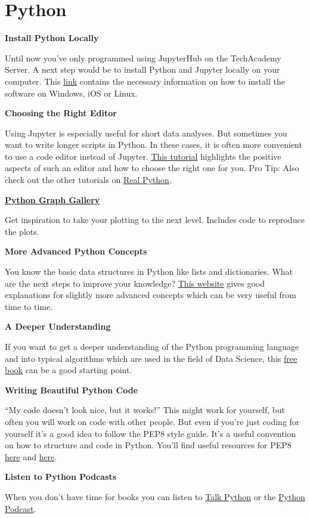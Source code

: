 \documentclass[
  11pt,
]{book}
\newenvironment{tipsp}[1]
  {
  \begin{itemize}
  \footnotesize
  \renewcommand{\labelitemi}{
    \raisebox{-.7\height}[0pt][0pt]{
      {\setkeys{Gin}{width=3em,keepaspectratio}
        \texttt{[image: images/\#1.png]}}
    }
  }
  \setlength{\fboxsep}{1em}
  \begin{pbox}
  \item
  }
  {
  \end{pbox}
  \end{itemize}
  }
\begin{document}
\hypertarget{python}{%
\section{Python}\label{python}}

\begin{tipsp}p

\textbf{Install Python Locally}

Until now you've only programmed using JupyterHub on the TechAcademy Server. A next step would be to install Python and Jupyter locally on your computer. This \href{https://docs.anaconda.com/anaconda/install/}{link} contains the necessary information on how to install the software on Windows, iOS or Linux.

\textbf{Choosing the Right Editor}

Using Jupyter is especially useful for short data analyses. But sometimes you want to write longer scripts in Python. In these cases, it is often more convenient to use a code editor instead of Jupyter. \href{https://realpython.com/learning-paths/perfect-your-python-development-setup/}{This tutorial} highlights the positive aspects of such an editor and how to choose the right one for you. Pro Tip: Also check out the other tutorials on \href{https://realpython.com/}{Real Python}.

\textbf{\href{https://python-graph-gallery.com/}{Python Graph Gallery}}

Get inspiration to take your plotting to the next level. Includes code to reproduce the plots.

\textbf{More Advanced Python Concepts}

You know the basic data structures in Python like lists and dictionaries. What are the next steps to improve your knowledge? \href{https://book.pythontips.com/en/latest/index.html}{This website} gives good explanations for slightly more advanced concepts which can be very useful from time to time.

\textbf{A Deeper Understanding}

If you want to get a deeper understanding of the Python programming language and into typical algorithms which are used in the field of Data Science, this \href{https://github.com/ab-anand/py-books/blob/master/Data\%20Science\%20from\%20Scratch-\%20First\%20Principles\%20with\%20Python.pdf}{free book} can be a good starting point.

\textbf{Writing Beautiful Python Code}

``My code doesn't look nice, but it works!''
This might work for yourself, but often you will work on code with other people. But even if you're just coding for yourself it's a good idea to follow the PEP8 style guide. It's a useful convention on how to structure and code in Python. You'll find useful resources for PEP8 \href{https://realpython.com/python-pep8/}{here} and \href{https://www.python.org/dev/peps/pep-0020/\#id2}{here}.

\textbf{Listen to Python Podcasts}

When you don't have time for books you can listen to \href{https://talkpython.fm/home}{Talk Python} or the \href{https://www.pythonpodcast.com}{Python Podcast}.

\end{tipsp}

  
\end{document}
